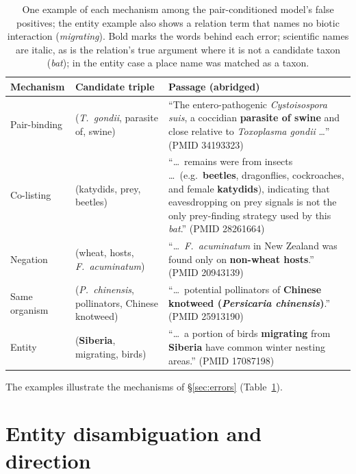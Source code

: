 \documentclass[11pt]{article}
\begin{document}
\begin{table}[t]\centering\small
\begin{tabular}{@{}llp{}@{}}
\toprule
Mechanism & Candidate triple & Passage (abridged) \\
\midrule
Pair-binding & (\emph{T.\ gondii}, parasite of, swine) &
``The entero-pathogenic \emph{Cystoisospora suis}, a coccidian \textbf{parasite of swine} and close
relative to \emph{Toxoplasma gondii} \ldots'' (PMID 34193323) \\[1pt]
Co-listing & (katydids, prey, beetles) &
``\ldots\ remains were from insects \ldots\ (e.g.\ \textbf{beetles}, dragonflies, cockroaches, and
female \textbf{katydids}), indicating that eavesdropping on prey signals is not the only
prey-finding strategy used by this \emph{bat}.'' (PMID 28261664) \\[1pt]
Negation & (wheat, hosts, \emph{F.\ acuminatum}) &
``\ldots\ \emph{F.\ acuminatum} in New Zealand was found only on \textbf{non-wheat hosts}.'' (PMID 20943139) \\[1pt]
Same organism & (\emph{P.\ chinensis}, pollinators, Chinese knotweed) &
``\ldots\ potential pollinators of \textbf{Chinese knotweed (\emph{Persicaria chinensis})}.'' (PMID 25913190) \\[1pt]
Entity & (\textbf{Siberia}, migrating, birds) &
``\ldots\ a portion of birds \textbf{migrating} from \textbf{Siberia} have common winter nesting
areas.'' (PMID 17087198) \\
\bottomrule
\end{tabular}
\caption{One example of each mechanism among the pair-conditioned model's false positives; the
entity example also shows a relation term that names no biotic interaction (\emph{migrating}). Bold
marks the words behind each error; scientific names are italic, as is the relation's true argument
where it is not a candidate taxon (\emph{bat}); in the entity case a place name was matched as a taxon.}
\label{tab:examples}
\end{table}

The examples illustrate the mechanisms of \S\ref{sec:errors} (Table~\ref{tab:examples}).

\section{Entity disambiguation and direction}
\label{sec:notfixed}
\end{document}
